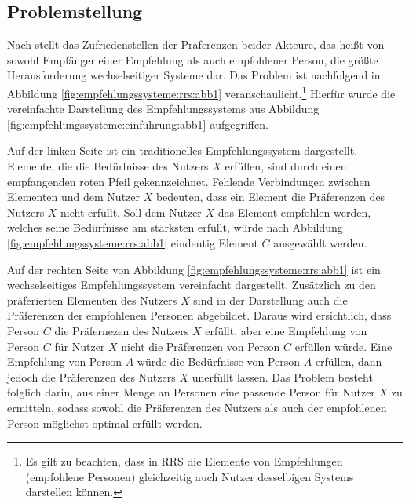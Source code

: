 \subsection{Problemstellung}\label{ch:empfehlungssyteme:rrs:problem}
Nach \textcite[S. 35]{li:inproceedings} stellt das Zufriedenstellen der Präferenzen beider Akteure, das heißt von sowohl Empfänger einer Empfehlung als auch empfohlener Person, die größte Herausforderung wechselseitiger Systeme dar.
Das Problem ist nachfolgend in Abbildung \ref{fig:empfehlungssysteme:rrs:abb1} veranschaulicht.\footnote{Es gilt zu beachten, dass in \ac{RRS} die Elemente von Empfehlungen (empfohlene Personen) gleichzeitig auch Nutzer desselbigen Systems darstellen können.}
Hierfür wurde die vereinfachte Darstellung des Empfehlungssystems aus Abbildung \ref{fig:empfehlungssysteme:einführung:abb1} aufgegriffen.

Auf der linken Seite ist ein traditionelles Empfehlungssystem dargestellt.
Elemente, die die Bedürfnisse des Nutzers $X$ erfüllen, sind durch einen empfangenden roten Pfeil gekennzeichnet.
Fehlende Verbindungen zwischen Elementen und dem Nutzer $X$ bedeuten, dass ein Element die Präferenzen des Nutzers $X$ nicht erfüllt.
Soll dem Nutzer $X$ das Element empfohlen werden, welches seine Bedürfnisse am stärksten erfüllt, würde nach Abbildung \ref{fig:empfehlungssysteme:rrs:abb1} eindeutig Element $C$ ausgewählt werden.

Auf der rechten Seite von Abbildung \ref{fig:empfehlungssysteme:rrs:abb1} ist ein wechselseitiges Empfehlungssystem vereinfacht dargestellt.
Zusätzlich zu den präferierten Elementen des Nutzers $X$ sind in der Darstellung auch die Präferenzen der empfohlenen Personen abgebildet.
Daraus wird ersichtlich, dass Person $C$ die Präfernezen des Nutzers $X$ erfüllt, aber eine Empfehlung von Person $C$ für Nutzer $X$ nicht die Präferenzen von Person $C$ erfüllen würde.
Eine Empfehlung von Person $A$ würde die Bedürfnisse von Person $A$ erfüllen, dann jedoch die Präferenzen des Nutzers $X$ unerfüllt lassen.
Das Problem besteht folglich darin, aus einer Menge an Personen eine passende Person für Nutzer $X$ zu ermitteln, sodass sowohl die Präferenzen des Nutzers als auch der empfohlenen Person möglichst optimal erfüllt werden.

